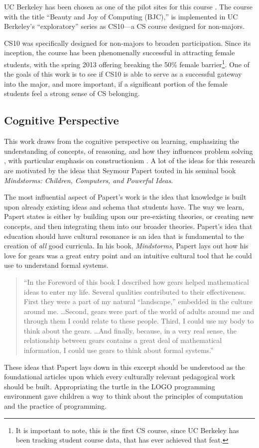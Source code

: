 \documentclass[oneside,titlepage,numbers=noenddot,headinclude,%
               footinclude=true,cleardoublepage=empty,abstractoff,BCOR=2mm,%
               paper=a4,fontsize=11pt,ngerman,american]{scrreprt}
\numberwithin{theorem}{chapter}
\numberwithin{definition}{chapter}
\numberwithin{algorithm}{chapter}
\numberwithin{figure}{chapter}
\numberwithin{table}{chapter}
\numberwithin{equation}{chapter}
\begin{document}
UC Berkeley has been chosen as one of the pilot sites for this course \cite{Astrachan:2011:CPP:1953163.1953281}. The course with the title ``Beauty and Joy of Computing (BJC),'' is implemented in UC Berkeley's ``exploratory'' series as CS10---a CS course designed for non-majors. 

CS10 was specifically designed for non-majors to broaden participation. Since its inception, the course has been phenomenally successful in attracting female students, with the spring 2013 offering breaking the 50\% female barrier\footnote{ It is important to note, this is the first CS course, since UC Berkeley has been tracking student course data, that has ever achieved that feat.}. One of the goals of this work is to see if CS10 is able to serve as a successful gateway into the major, and more important, if a significant portion of the female students feel a strong sense of CS belonging.

\subsection *{Cognitive Perspective}

This work draws from the cognitive perspective on learning, emphasizing the understanding of concepts, of reasoning, and how they influences problem solving \cite{Greeno1996}, with particular emphasis on constructionism \cite{Papert1980}. A lot of the ideas for this research are motivated by the ideas that Seymour Papert touted in his seminal book \textit{Mindstorms: Children, Computers, and Powerful Ideas}. 

The most influential aspect of Papert's work is the idea that knowledge is built upon already existing ideas and schema that students have. The way we learn, Papert states is either by building upon our pre-existing theories, or creating new concepts, and then integrating them into our broader theories. Papert's idea that education should have cultural resonance is an idea that is fundamental to the creation of \textit{all} good curricula. In his book, \textit{Mindstorms}, Papert lays out how his love for gears was a great entry point and an intuitive cultural tool that he could use to understand formal systems. 
\begin{quote}
``In the Foreword of this book I described how gears helped mathematical ideas to enter my life. Several qualities contributed to their effectiveness. First they were a part of my natural ``landscape,'' embedded in the culture around me. \ldots Second, gears were part of the world of adults around me and through them I could relate to these people. Third, I could use my body to think about the gears. \ldots And finally, because, in a very real sense, the relationship between gears contains a great deal of mathematical information, I could use gears to think about formal systems.'' \cite[pp. 11]{Papert1980} 
\end{quote} 
These ideas that Papert lays down in this excerpt should be understood as the foundational articles upon which every culturally relevant pedagogical work should be built. Appropriating the turtle in the LOGO programming environment gave children a way to think about the principles of computation and the practice of programming. 
\end{document}
